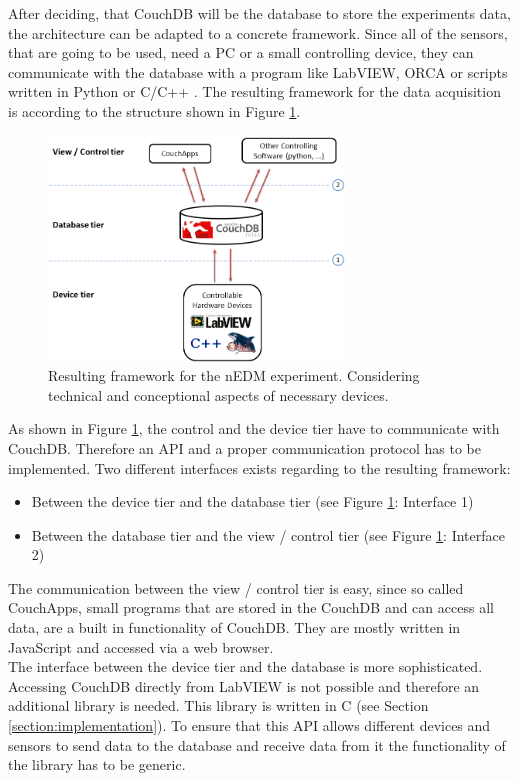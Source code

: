 After deciding, that CouchDB will be the database to store the experiments data, the architecture can be adapted to a concrete framework. Since all of the sensors, that are going to be used, need a PC or a small controlling device, they can communicate with the database with a program like LabVIEW, ORCA or scripts written in Python or C/C++ . The resulting framework for the data acquisition is according to the structure shown in Figure \ref{figure:ResultingFramework}. 
  
\begin{figure}[h!]
  \centering
      \includegraphics[width=0.7\textwidth]{images/ResultingFramework.png}
  \caption{Resulting framework for the nEDM experiment. Considering technical and conceptional aspects of necessary devices.}
  \label{figure:ResultingFramework}
\end{figure}

As shown in Figure \ref{figure:ResultingFramework}, the control and the device tier have to communicate with CouchDB. Therefore an API and a proper communication protocol has to be implemented. Two different interfaces exists regarding to the resulting framework:
\begin{itemize}
\item Between the device tier and the database tier (see Figure \ref{figure:ResultingFramework}: Interface 1)
\item Between the database tier and the view / control tier (see Figure \ref{figure:ResultingFramework}: Interface 2)
\end{itemize}
The communication between the view / control tier is easy, since so called CouchApps, small programs that are stored in the CouchDB and can access all data, are a built in functionality of CouchDB. They are mostly written in JavaScript and accessed via a web browser.\\
The interface between the device tier and the database is more sophisticated. Accessing CouchDB directly from LabVIEW is not possible and therefore an additional library is needed. This library is written in C (see Section \ref{section:implementation}). To ensure that this API allows different devices and sensors to send data to the database and receive data from it the functionality of the library has to be generic.

